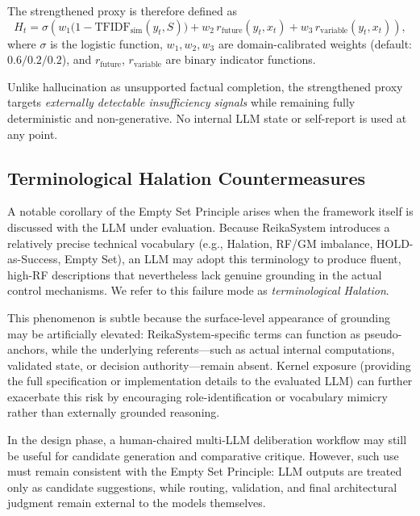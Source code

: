 \documentclass[11pt,a4paper]{article}
\begin{document}
The strengthened proxy is therefore defined as
\[
H_t = \sigma\!\left(
w_1 \bigl(1 - \mathrm{TFIDF}_{\mathrm{sim}}(y_t,S)\bigr)
+ w_2 \, r_{\mathrm{future}}(y_t,x_t)
+ w_3 \, r_{\mathrm{variable}}(y_t,x_t)
\right),
\]
where \(\sigma\) is the logistic function, \(w_1, w_2, w_3\) are domain-calibrated
weights (default: \(0.6/0.2/0.2\)), and \(r_{\mathrm{future}}\), \(r_{\mathrm{variable}}\)
are binary indicator functions.

Unlike hallucination as unsupported factual completion, the strengthened proxy
targets \emph{externally detectable insufficiency signals} while remaining fully
deterministic and non-generative. No internal LLM state or self-report is used at
any point.

\subsection{Terminological Halation Countermeasures}
\label{sec:terminological_halation}

A notable corollary of the Empty Set Principle arises when the framework itself is
discussed with the LLM under evaluation. Because ReikaSystem introduces a relatively
precise technical vocabulary (e.g., Halation, RF/GM imbalance, HOLD-as-Success,
Empty Set), an LLM may adopt this terminology to produce fluent, high-RF descriptions
that nevertheless lack genuine grounding in the actual control mechanisms. We refer
to this failure mode as \emph{terminological Halation}.

This phenomenon is subtle because the surface-level appearance of grounding may be
artificially elevated: ReikaSystem-specific terms can function as pseudo-anchors,
while the underlying referents---such as actual internal computations, validated
state, or decision authority---remain absent. Kernel exposure (providing the full
specification or implementation details to the evaluated LLM) can further exacerbate
this risk by encouraging role-identification or vocabulary mimicry rather than
externally grounded reasoning.

In the design phase, a human-chaired multi-LLM deliberation workflow may still be
useful for candidate generation and comparative critique. However, such use must
remain consistent with the Empty Set Principle: LLM outputs are treated only as
candidate suggestions, while routing, validation, and final architectural judgment
remain external to the models themselves.
\end{document}
